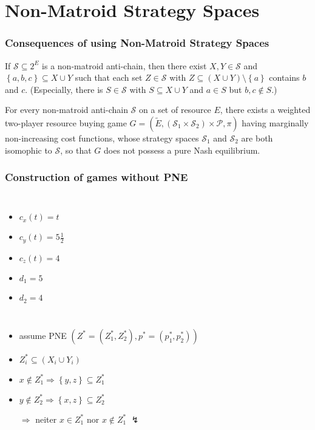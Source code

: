 \documentclass{beamer}
\newcommand{\tupel}[1]{\left(#1\right)}
\newcommand{\set}[1]{\left\{#1\right\}}
\begin{document}
\section{Non-Matroid Strategy Spaces}
\begin{frame}
\frametitle{Consequences of using Non-Matroid Strategy Spaces}
  \begin{lemma}
    If $\mathcal{S}\subseteq 2^{E}$ is a non-matroid anti-chain, then there
    exist $X,Y\in\mathcal{S}$ and $\set{a,b,c}\subseteq X\cup Y$ such that each
    set $Z\in\mathcal{S}$ with $Z\subseteq(X\cup Y)\setminus\set{a}$ contains
    $b$ and $c$. (Especially, there is $S\in\mathcal{S}$ with
    $S\subseteq X\cup Y$ and $a\in S$ but $b,c\notin S$.)
  \end{lemma}
  \begin{theorem}
    For every non-matroid anti-chain $\mathcal{S}$ on a set of resource $E$,
    there exists a weighted two-player resource buying game
    $G = \tupel{\tilde{E}, \tupel{\mathcal{S}_{1} \times
    \mathcal{S}_{2}}\times \mathcal{P}, \pi}$ having marginally non-increasing
    cost functions, whose strategy spaces $\mathcal{S}_{1}$ and
    $\mathcal{S}_{2}$ are both isomophic to $\mathcal{S}$, so that $G$ does not
    possess a pure Nash equilibrium.
  \end{theorem}
\end{frame}

\begin{frame}
  \frametitle{Construction of games without PNE}
   \begin{columns}
       \begin{itemize}
         \item $c_{x}(t) = t$
         \item $c_{y}(t) = 5\frac{1}{2}$
         \item $c_{z}(t) = 4$
         \item $d_{1} = 5$
         \item $d_{2} = 4$
       \end{itemize}
       \begin{center}
         \resizebox{\textwidth}{!}{}
       \end{center}
   \end{columns}
   \begin{itemize}
     \item assume PNE $\tupel{Z^{\ast} = \tupel{Z_{1}^{\ast}, Z_{2}^{\ast}},
       p^{\ast} = \tupel{p_{1}^{\ast}, p_{2}^{\ast}}}$
     \item $Z_{i}^{\ast}\subseteq\tupel{X_{i}\cup Y_{i}}$
     \item $x\not\in Z_{1}^{\ast}\Rightarrow \set{y,z}\subseteq Z_{1}^{\ast}$
     \item $y\not\in Z_{2}^{\ast}\Rightarrow \set{x,z}\subseteq Z_{2}^{\ast}$
     \item[$\Rightarrow$] neiter $x\in Z_{1}^{\ast}$ nor $x\not\in Z_{1}^{\ast}$ $\lightning$
   \end{itemize}
\end{frame}
\end{document}
